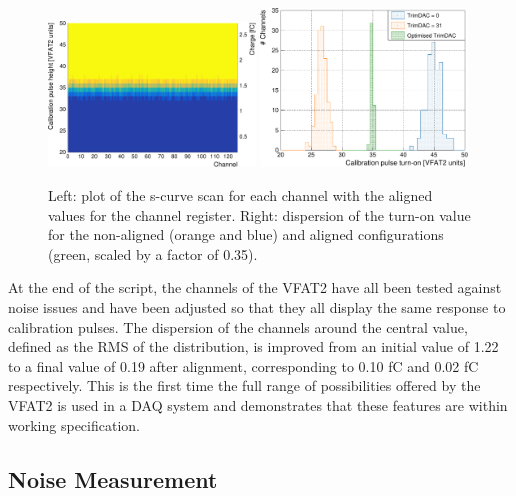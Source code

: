       \begin{figure}[t!]
        \centering
        \includegraphics[width=0.49\textwidth]{img/plots/cSCurve_ChannelVCal_Trimed-crop}
        \includegraphics[width=0.49\textwidth]{img/plots/cSCurve_ChannelVCal_Disp-crop}
        \caption{Left: plot of the s-curve scan for each channel with the aligned values for the channel register. Right: dispersion of the turn-on value for the non-aligned (orange and blue) and aligned configurations (green, scaled by a factor of 0.35).}
        \label{fig:II-4-trimed}
      \end{figure}

      At the end of the script, the channels of the VFAT2 have all been tested against noise issues and have been adjusted so that they all display the same response to calibration pulses. The dispersion of the channels around the central value, defined as the RMS of the distribution, is improved from an initial value of 1.22 to a final value of 0.19 after alignment, corresponding to 0.10 fC and 0.02 fC respectively. This is the first time the full range of possibilities offered by the VFAT2 is used in a DAQ system and demonstrates that these features are within working specification.

    \subsection{Noise Measurement}

